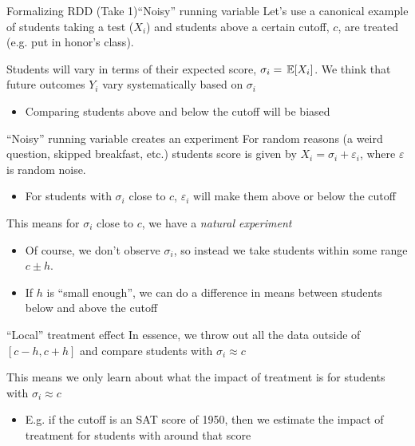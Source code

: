 \documentclass[aspectratio=169,t,11pt,table]{beamer}
\begin{document}
\begin{frame}{Formalizing RDD (Take 1)}{``Noisy'' running variable}
  Let's use a canonical example of students taking a test ($X_i$) and students above a certain cutoff, $c$, are treated (e.g. put in honor's class).

  \bigskip
  Students will vary in terms of their expected score, $\sigma_i = \expec{X_i}$. We think that future outcomes $Y_i$ vary systematically based on $\sigma_i$
  \begin{itemize}
    \item Comparing students above and below the cutoff will be biased  
  \end{itemize}
\end{frame}

\begin{frame}{``Noisy'' running variable creates an experiment}{}
  For random reasons (a weird question, skipped breakfast, etc.) students score is given by $X_i = \sigma_i + \varepsilon_i$, where $\varepsilon$ is random noise.
  \begin{itemize}
    \item For students with $\sigma_i$ close to $c$, $\varepsilon_i$ will make them above or below the cutoff
  \end{itemize}

  \pause
  \bigskip
  This means for $\sigma_i$ close to $c$, we have a \emph{natural experiment}
  \begin{itemize}
    \item Of course, we don't observe $\sigma_i$, so instead we take students within some range $c \pm h$. 
    
    \item If $h$ is ``small enough'', we can do a difference in means between students below and above the cutoff
  \end{itemize}
\end{frame}


\begin{frame}{``Local'' treatment effect}{}
  In essence, we throw out all the data outside of $\left[ c-h, c+h \right]$ and compare students with $\sigma_i \approx c$
  
  \bigskip
  This means we only learn about what the impact of treatment is for students with $\sigma_i \approx c$
  \begin{itemize}
    \item E.g. if the cutoff is an SAT score of 1950, then we estimate the impact of treatment for students with around that score
  \end{itemize}
\end{frame}
\end{document}
